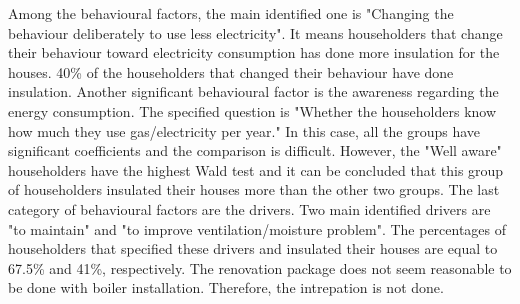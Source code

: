 \documentclass[preprint,12pt,3p]{elsarticle}
\begin{document}
Among the behavioural factors, the main identified one is "Changing the behaviour deliberately to use less electricity". It means householders that change their behaviour toward electricity consumption has done more insulation for the houses. 40\% of the householders that changed their behaviour have done insulation.  Another significant behavioural factor is the awareness regarding the energy consumption. The specified question is "Whether the householders know how much they use gas/electricity per year." In this case, all the groups have significant coefficients and the comparison is difficult. However, the "Well aware" householders have the highest Wald test and it can be concluded that this group of householders insulated their houses more than the other two groups. The last category of behavioural factors are the drivers. Two main identified drivers are "to maintain" and "to improve ventilation/moisture problem". The percentages of householders that specified these drivers and insulated their houses are equal to 67.5\% and 41\%, respectively. The renovation package does not seem reasonable to be done with boiler installation. Therefore, the intrepation is not done. 
\end{document}
